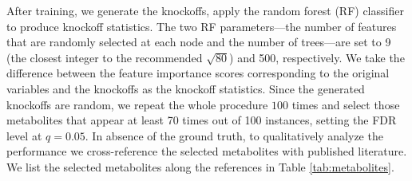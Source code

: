 \documentclass{article}
\theoremstyle{definition}
\begin{document}
After training, we generate the knockoffs, apply the random forest (RF) classifier \cite{trainor2017evaluation} to produce knockoff statistics. The two RF parameters---the number of features that are randomly selected at each node and the number of trees---are set to 9 (the closest integer to the recommended $\sqrt{80}$) and 500, respectively. We take the difference between the feature importance scores \cite{trainor2017evaluation} corresponding to the original variables and the knockoffs as the knockoff statistics. Since the generated knockoffs are random, we repeat the whole procedure $100$ times and select those metabolites that appear at least 70 times out of 100 instances, setting the FDR level at $q = 0.05$. In absence of the ground truth, to qualitatively analyze the performance we cross-reference the selected metabolites with published literature. We list the selected metabolites along the references in Table \ref{tab:metabolites}.
\end{document}
